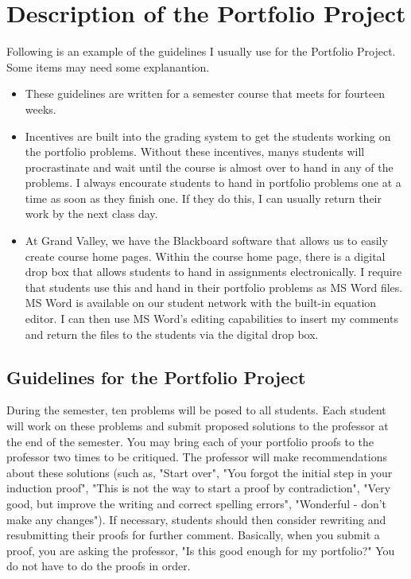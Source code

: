\section*{Description of the Portfolio Project}
Following is an example of the guidelines I usually use for the Portfolio Project.  Some items may need some explanantion.
\begin{itemize}
\item These guidelines are written for a semester course that meets for fourteen weeks.
\item Incentives are built into the grading system to get the students working on the portfolio problems.  Without these incentives, manys students will procrastinate and wait until the course is almost over to hand in any of the problems.  I always encourate students to hand in portfolio problems one at a time as soon as they finish one.  If they do this, I can usually return their work by the next class day.
\item At Grand Valley, we have the Blackboard software that allows us to easily create course home pages.  Within the course home page, there is a digital drop box that allows students to hand in assignments electronically.  I require that students use this and hand in their portfolio problems as MS Word files.  MS Word is available on our student network with the built-in equation editor.  I can then use MS Word's editing capabilities to insert my comments and return the files to the students via the digital drop box.
\end{itemize}

\vskip6pt
\noindent
\subsection*{Guidelines for the Portfolio Project}
During the semester, ten problems will be posed to all students.  Each student will work on these problems and submit proposed solutions to the professor at the end of the semester. You may bring  each of your portfolio proofs to the professor two times to be critiqued.  The professor will make recommendations about these solutions (such as, "Start over", "You forgot the initial step in your induction proof", "This is not the way to start a proof by contradiction", "Very good, but improve the writing and correct spelling errors", "Wonderful - don't make any changes").  If necessary, students should then consider rewriting and resubmitting their proofs for further comment.  Basically, when you submit a proof, you are asking the professor, "Is this good enough for my portfolio?"  You do not have to do the proofs in order.

